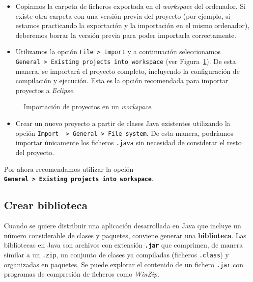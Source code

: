 \documentclass[
  spanish,
  11pt,
  a4paper,
  DIV=11,
  numbers=noendperiod]{scrartcl}
\providecommand{\tightlist}{%
  \setlength{\itemsep}{0pt}\setlength{\parskip}{0pt}}
\begin{document}
\begin{itemize}
\tightlist
\item
 Copiamos la carpeta de ficheros exportada en el \emph{workspace} del ordenador. Si existe otra carpeta con una versión previa del proyecto (por ejemplo, si estamos practicando la exportación y la importación en el mismo ordenador), deberemos borrar la versión previa para poder importarla correctamente.
\item
 Utilizamos la opción \texttt{File\ \textgreater{}\ Import} y a continuación seleccionamos \texttt{General\ \textgreater{}\ Existing\ projects\ into\ workspace} (ver Figura~\ref{fig-import_project}). De esta manera, se importará el proyecto completo, incluyendo la configuración de compilación y ejecución. Esta es la opción recomendada para importar proyectos a \emph{Eclipse}.
\end{itemize}

\begin{figure}
\caption{Importación de proyectos en un \emph{workspace}.}\label{fig-import_project}
\end{figure}

\begin{itemize}
\tightlist
\item
 Crear un nuevo proyecto a partir de clases Java existentes utilizando la opción \texttt{Import\ \ \textgreater{}\ General\ \textgreater{}\ File\ system}. De esta manera, podríamos importar únicamente los ficheros \texttt{.java} sin necesidad de considerar el resto del proyecto.
\end{itemize}

Por ahora recomendamos utilizar la opción \textbf{\texttt{General\ \textgreater{}\ Existing\ projects\ into\ workspace}}.

\subsection{Crear biblioteca}\label{crear-biblioteca}

Cuando se quiere distribuir una aplicación desarrollada en Java que incluye un número considerable de clases y paquetes, conviene generar una \textbf{biblioteca}. Las bibliotecas en Java son archivos con extensión \textbf{\texttt{.jar}} que comprimen, de manera similar a un \texttt{.zip}, un conjunto de clases ya compiladas (ficheros \texttt{.class}) y organizadas en paquetes. Se puede explorar el contenido de un fichero \texttt{.jar} con programas de compresión de ficheros como \emph{WinZip}.
\end{document}
